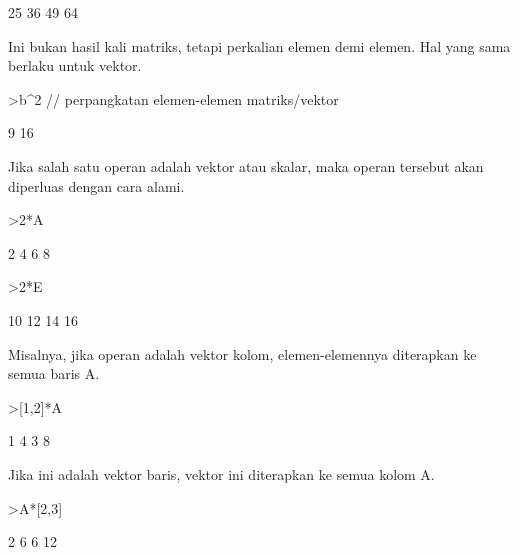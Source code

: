 \documentclass[a4paper,10pt]{article}
\begin{document}
\begin{eulernotebook}
\begin{eulercomment}
\begin{eulercomment}
\begin{eulercomment}
\begin{eulercomment}
\begin{euleroutput}
                       25                      36 
                       49                      64 
\end{euleroutput}
\begin{eulercomment}
Ini bukan hasil kali matriks, tetapi perkalian elemen demi elemen. Hal
yang sama berlaku untuk vektor.
\end{eulercomment}
\begin{eulerprompt}
>b^2 // perpangkatan elemen-elemen matriks/vektor
\end{eulerprompt}
\begin{euleroutput}
                        9 
                       16 
\end{euleroutput}
\begin{eulercomment}
Jika salah satu operan adalah vektor atau skalar, maka operan tersebut
akan diperluas dengan cara alami.
\end{eulercomment}
\begin{eulerprompt}
>2*A
\end{eulerprompt}
\begin{euleroutput}
                        2                       4 
                        6                       8 
\end{euleroutput}
\begin{eulerprompt}
>2*E
\end{eulerprompt}
\begin{euleroutput}
                       10                      12 
                       14                      16 
\end{euleroutput}
\begin{eulercomment}
Misalnya, jika operan adalah vektor kolom, elemen-elemennya diterapkan
ke semua baris A.
\end{eulercomment}
\begin{eulerprompt}
>[1,2]*A
\end{eulerprompt}
\begin{euleroutput}
              1             4 
              3             8 
\end{euleroutput}
\begin{eulercomment}
Jika ini adalah vektor baris, vektor ini diterapkan ke semua kolom A.
\end{eulercomment}
\begin{eulerprompt}
>A*[2,3]
\end{eulerprompt}
\begin{euleroutput}
                        2                       6 
                        6                      12 

\end{euleroutput}
\end{eulercomment}
\end{eulercomment}
\end{eulercomment}
\end{eulercomment}
\end{eulernotebook}
\end{document}
